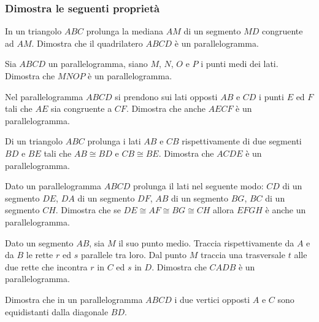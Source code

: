 \begin{multicols}{2}

\subsubsection*{Dimostra le seguenti proprietà}

\begin{esercizio}
	\label{ese:4.10}
	In un triangolo $ABC$ prolunga la mediana $AM$ di un segmento $MD$ 
	congruente ad $AM$. Dimostra che il quadrilatero $ABCD$ è un 
	parallelogramma.
\end{esercizio}

\begin{esercizio}
	\label{ese:4.11}
	Sia $ABCD$ un parallelogramma, siano $M$, $N$, $O$ e $P$ i punti medi 
	dei lati. Dimostra che $MNOP$ è un parallelogramma.
\end{esercizio}

\begin{esercizio}
	\label{ese:4.13}
	Nel parallelogramma $ABCD$ si prendono sui lati opposti $AB$ e $CD$ i 
	punti $E$ ed $F$ tali che $AE$ sia congruente a $CF$. Dimostra che 
	anche $AECF$ è un parallelogramma.
\end{esercizio}

\begin{esercizio}
	\label{ese:4.14}
	Di un triangolo $ABC$ prolunga i lati $AB$ e $CB$ rispettivamente di 
	due segmenti $BD$ e $BE$ tali che $AB\cong BD$ e $CB\cong BE$. 
	Dimostra che $ACDE$ è un parallelogramma.
\end{esercizio}

\begin{esercizio}
	\label{ese:4.17}
	Dato un parallelogramma $ABCD$ prolunga il lati nel seguente modo: 
	$CD$ di un segmento $DE$, $DA$ di un segmento $DF$, $AB$ di un 
	segmento $BG$, $BC$ di un segmento $CH$. Dimostra che se $DE\cong 
	AF\cong BG\cong CH$ allora $EFGH$ è anche un parallelogramma.
\end{esercizio}

\begin{esercizio}
	\label{ese:4.18}
	Dato un segmento $AB$, sia $M$ il suo punto medio. Traccia 
	rispettivamente da $A$ e da $B$ le rette $r$ ed $s$ parallele tra 
	loro. Dal punto $M$ traccia una trasversale $t$ alle due rette che 
	incontra $r$ in $C$ ed $s$ in $D$. Dimostra che $CADB$ è un 
	parallelogramma.
\end{esercizio}

\begin{esercizio}
	\label{ese:4.19}
	Dimostra che in un parallelogramma $ABCD$ i due vertici opposti $A$ e 
	$C$ sono equidistanti dalla diagonale $BD$.
\end{esercizio}


\end{multicols}

